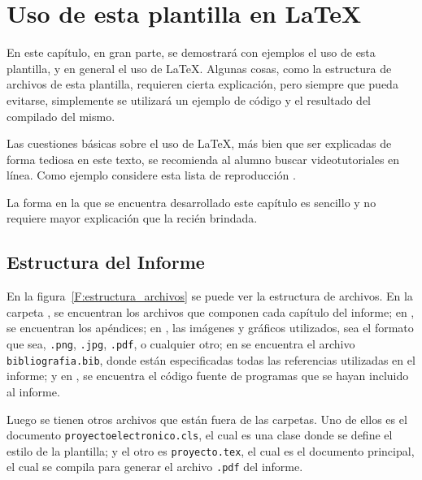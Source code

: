   \chapter{Uso de esta plantilla en \LaTeX}

En este capítulo, en gran parte, se demostrará con ejemplos el uso de esta plantilla, y en general el uso de \LaTeX. Algunas cosas, como la estructura de archivos de esta plantilla, requieren cierta explicación, pero siempre que pueda evitarse, simplemente se utilizará un ejemplo de código y el resultado del compilado del mismo. \cite{Instruments1978}

Las cuestiones básicas sobre el uso de \LaTeX, más bien que ser explicadas de forma tediosa en este texto, se recomienda al alumno buscar videotutoriales en línea. Como ejemplo considere esta lista de reproducción \cite{tutorial_latex}.

La forma en la que se encuentra desarrollado este capítulo es sencillo y no requiere mayor explicación que la recién brindada.

\section{Estructura del Informe}

En la figura~\ref{F:estructura_archivos} se puede ver la estructura de archivos. En la carpeta , se encuentran los archivos que componen cada capítulo del informe; en , se encuentran los apéndices; en , las imágenes y gráficos utilizados, sea el formato que sea, \texttt{.png}, \texttt{.jpg}, \texttt{.pdf}, o cualquier otro; en  se encuentra el archivo \texttt{bibliografia.bib}, donde están especificadas todas las referencias utilizadas en el informe; y en , se encuentra el código fuente de programas que se hayan incluido al informe.

Luego se tienen otros archivos que están fuera de las carpetas. Uno de ellos es el documento \texttt{proyectoelectronico.cls}, el cual es una clase donde se define el estilo de la plantilla; y el otro es \texttt{proyecto.tex}, el cual es el documento principal, el cual se compila para generar el archivo \texttt{.pdf} del informe.


